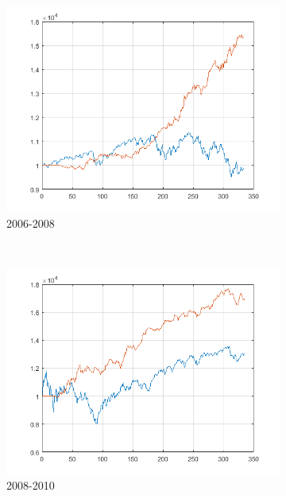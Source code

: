 \documentclass[11pt,a4,twosided,singlespacing,titlepagenumber=on]{scrreprt}
\numberwithin{equation}{chapter} %
\theoremstyle{remark}
\begin{document}
\begin{figure}[H]
\begin{subfigure}[t]{0.32\textwidth}
        \includegraphics[width=1\textwidth]{res/backtest_cpx/9}
        \caption{2006-2008}
    \end{subfigure} \\
    \begin{subfigure}[t]{0.32\textwidth}
        \centering
        \includegraphics[width=1\textwidth]{res/backtest/10}
        \caption{2008-2010}
    \end{subfigure}
    \begin{subfigure}[t]{0.32\textwidth}
        \centering

\end{subfigure}
\end{figure}
\end{document}
